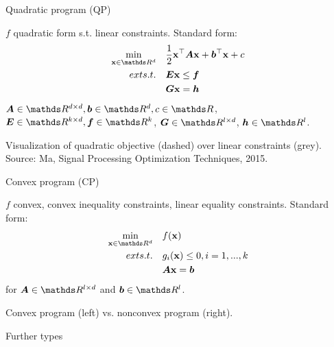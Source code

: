 \documentclass[11pt,compress,t,notes=noshow, xcolor=table]{beamer}
\begin{document}
\begin{framei}{Quadratic program (QP)}
\item $f$ quadratic form s.t. linear constraints. Standard form:
$$
\begin{aligned}
\min_{\xv \in \R^d} \quad & \frac{1}{2} \xv^\top \bm{A} \xv + \bm{b}^\top \xv + c \\
ext{s.t. } \quad & \bm{E}\xv \le \bm{f} \\
& \bm{G}\xv = \bm{h}
\end{aligned}
$$
$\bm{A} \in \R^{d \times d}, \bm{b} \in \R^d, c \in \R$, $\bm{E} \in \R^{k \times d}, \bm{f} \in \R^k$, $\bm{G} \in \R^{l \times d}$, $\bm{h} \in \R^l$.
\vfill
{}
\begin{footnotesize}
Visualization of quadratic objective (dashed) over linear constraints (grey). Source: Ma, Signal Processing Optimization Techniques, 2015. %
\end{footnotesize}
\end{framei}


\begin{framei}{Convex program (CP)}
\item $f$ convex, convex inequality constraints, linear equality constraints. Standard form:
$$
\begin{aligned}
\min_{\xv \in \R^d} \quad & \fx \\
ext{s.t. } \quad & g_i(\xv) \le 0, i = 1, ..., k \\
& \bm{A}\xv = \bm{b}
\end{aligned}
$$
for $\bm{A} \in \R^{l \times d}$ and $\bm{b} \in \R^l$.
\vfill
{}
\begin{center}\begin{footnotesize}
Convex program (left) vs. nonconvex program (right).
\end{footnotesize}\end{center}
\end{framei}


\begin{frame2}{Further types}
\end{frame2}
\end{document}
